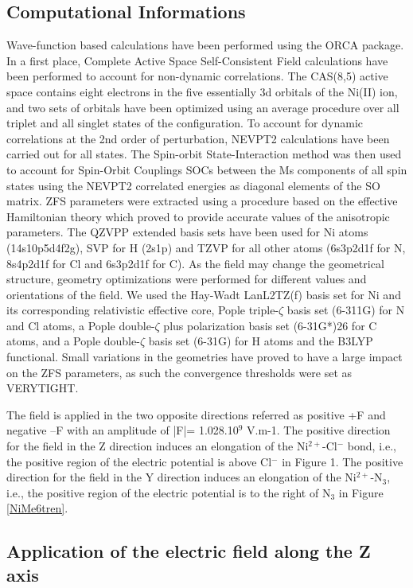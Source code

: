 \documentclass[10pt]{report}
\numberwithin{equation}{section}
\begin{document}
\subsection{Computational Informations}
Wave-function based calculations have been performed using the ORCA package.
In a first place, Complete Active Space Self-Consistent Field calculations have been performed to account for non-dynamic correlations. 
The CAS(8,5) active space contains eight electrons in the five essentially 3d orbitals of the Ni(II) ion, and two sets of orbitals have been optimized using an average procedure over all triplet and all singlet states of the configuration.
To account for dynamic correlations at the 2nd order of perturbation, NEVPT2 calculations have been carried out for all states. 
The Spin-orbit State-Interaction method was then used to account for Spin-Orbit Couplings SOCs between the Ms components of all spin states using the NEVPT2 correlated energies as diagonal elements of the SO matrix. 
ZFS parameters were extracted using a procedure based on the effective Hamiltonian theory which proved to provide accurate values of the anisotropic parameters. 
The QZVPP extended basis sets have been used for Ni atoms (14s10p5d4f2g), SVP for H (2s1p) and TZVP for all other atoms (6s3p2d1f for N, 8s4p2d1f for Cl and 6s3p2d1f for C). 
As the field may change the geometrical structure, geometry optimizations were performed for different values and orientations of the field. 
We used the Hay-Wadt LanL2TZ(f) basis set for Ni and its corresponding relativistic effective core, Pople triple-$\zeta$ basis set (6-311G) for N and Cl atoms, a Pople double-$\zeta$ plus polarization basis set (6-31G*)26 for C atoms, and a Pople double-$\zeta$ basis set (6-31G) for H atoms and the B3LYP functional.
Small variations in the geometries have proved to have a large impact on the ZFS parameters, as such the convergence thresholds were set as VERYTIGHT.

The field is applied in the two opposite directions referred as positive +F and negative –F with an amplitude of |F|= 1.028.10$^9$ V.m-1.
The positive direction for the field in the Z direction induces an elongation of the Ni$^{2+}$-Cl$^-$ bond, i.e., the positive region of the electric potential is above Cl$^-$ in Figure 1. 
The positive direction for the field in the Y direction induces an elongation of the Ni$^{2+}$-N$_3$, i.e., the positive region of the electric potential is to the right of N$_3$ in Figure \ref{NiMe6tren}.

\subsection{Application of the electric field along the Z axis}
\end{document}
